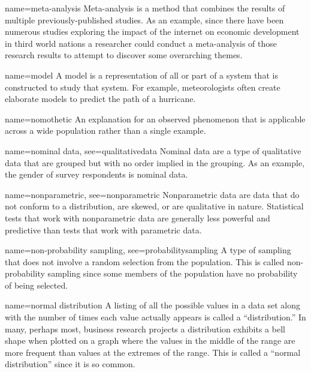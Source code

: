 {name={meta-analysis}}
{%
	Meta-analysis is a method that combines the results of multiple previously-published studies. As an example, since there have been numerous studies exploring the impact of the internet on economic development in third world nations a researcher could conduct a meta-analysis of those research results to attempt to discover some overarching themes.
}

{name={model}}
{%
	A model is a representation of all or part of a system that is constructed to study that system. For example, meteorologists often create elaborate models to predict 	the path of a hurricane. 
}



{name={nomothetic}}
{%
	An explanation for an observed phenomenon that is applicable across a wide population rather than a single example.
}

{name={nominal data},
	see={qualitativedata}}
{%
	Nominal data are a type of qualitative data that are grouped but with no order implied in the grouping. As an example, the gender of survey respondents is nominal data.
}

{name={nonparametric},
	see={nonparametric}}
{%
	Nonparametric data are data that do not conform to a distribution, are skewed, or are qualitative in nature. Statistical tests that work with nonparametric data are generally less powerful and predictive than tests that work with parametric data.
}

{name={non-probability sampling},
	see={probabilitysampling}}
{%
	A type of sampling that does not involve a random selection from the population. This is called non-probability sampling since some members of the population have no probability of being selected.
}

{name={normal distribution}}
{%
	A listing of all the possible values in a data set along with the number of times each value actually appears is called a ``distribution.'' In many, perhaps most, business research projects a distribution exhibits a bell shape when plotted on a graph where the values in the middle of the range are more frequent than values at the extremes of the range. This is called a ``normal distribution'' since it is so common.
}

